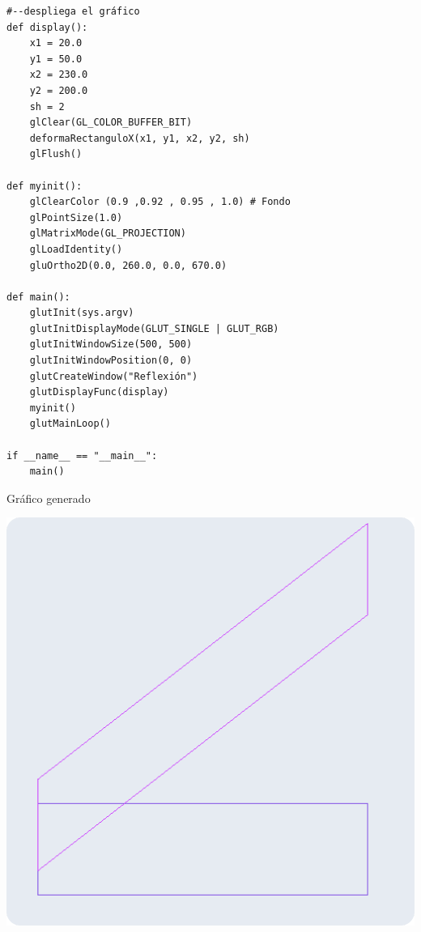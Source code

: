 \documentclass[a4paper]{article}
\begin{document}
\begin{center}
\begin{mycodebox}
\begin{lstlisting}
#--despliega el gráfico
def display():
    x1 = 20.0
    y1 = 50.0
    x2 = 230.0
    y2 = 200.0
    sh = 2
    glClear(GL_COLOR_BUFFER_BIT)
    deformaRectanguloX(x1, y1, x2, y2, sh)
    glFlush()
 
def myinit():
    glClearColor (0.9 ,0.92 , 0.95 , 1.0) # Fondo
    glPointSize(1.0) 
    glMatrixMode(GL_PROJECTION)
    glLoadIdentity()
    gluOrtho2D(0.0, 260.0, 0.0, 670.0)
 
def main():
    glutInit(sys.argv)
    glutInitDisplayMode(GLUT_SINGLE | GLUT_RGB)
    glutInitWindowSize(500, 500) 
    glutInitWindowPosition(0, 0)
    glutCreateWindow("Reflexión")
    glutDisplayFunc(display)
    myinit() 
    glutMainLoop()
 
if __name__ == "__main__":
    main()
\end{lstlisting}
\end{mycodebox}
\end{center}
\newpage
Gráfico generado\\
\begin{center}
\includegraphics[width=16cm]{src/2.png}
\end{center}
\newpage
\end{document}
